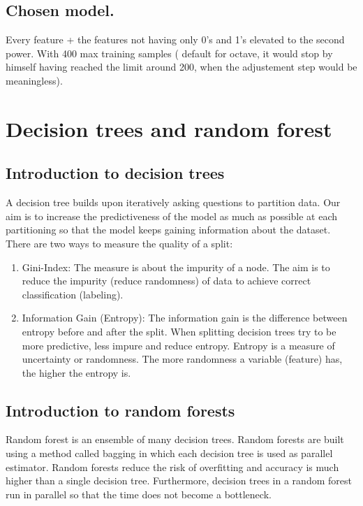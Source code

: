 \documentclass{article}
\begin{document}
\subsection{Chosen model.}
Every feature + the features not having only 0's and 1's elevated to the second power. With 400 max training samples ( default for octave, it would stop by himself having reached the limit around 200, when the adjustement step would be meaningless).

\section{Decision trees and random forest}
\subsection{Introduction to decision trees}
A decision tree builds upon iteratively asking questions to partition data.
Our aim is to increase the predictiveness of the model as much as possible at each partitioning so that the model keeps gaining information about the dataset.
There are two ways to measure the quality of a split:
\begin{enumerate}
	\item Gini-Index: The measure is about the impurity of a node. The aim is to reduce the impurity (reduce randomness) of data to achieve correct classification (labeling).
	\item Information Gain (Entropy):
	The information gain is the difference between entropy before and after the split.
	When splitting decision trees try to be more predictive, less impure and reduce entropy. Entropy is a measure of uncertainty or randomness. The more randomness a variable (feature) has, the higher the entropy is.  
\end{enumerate}

\subsection{Introduction to random forests}
Random forest is an ensemble of many decision trees. Random forests are built using a method called bagging in which each decision tree is used as parallel estimator.
Random forests reduce the risk of overfitting and accuracy is much higher than a single decision tree. Furthermore, decision trees in a random forest run in parallel so that the time does not become a bottleneck.
\end{document}
